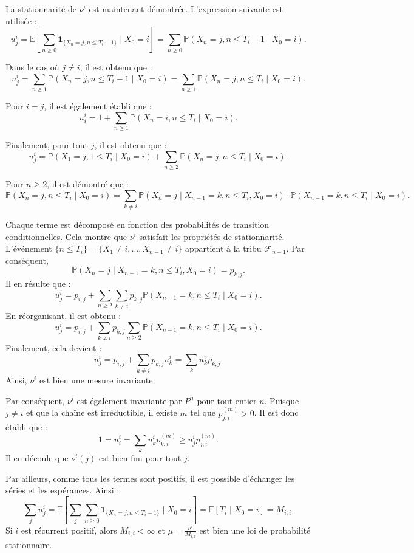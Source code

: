 \begin{sloppypar}
La stationnarité de $\nu^i$ est maintenant démontrée. L'expression suivante est utilisée :
\[
u^i_j = \mathbb{E} \left[\sum_{n \geq 0} \mathbf{1}_{\{X_n = j, n \leq T_i - 1\}} \mid X_0 = i \right] 
= \sum_{n \geq 0} \mathbb{P}(X_n = j, n \leq T_i - 1 \mid X_0 = i).
\]

Dans le cas où $j \neq i$, il est obtenu que :
\[
u^i_j = \sum_{n \geq 1} \mathbb{P}(X_n = j, n \leq T_i - 1 \mid X_0 = i) = \sum_{n \geq 1} \mathbb{P}(X_n = j, n \leq T_i \mid X_0 = i).
\]

Pour $i = j$, il est également établi que :
\[
u^i_i = 1 + \sum_{n \geq 1} \mathbb{P}(X_n = i, n \leq T_i \mid X_0 = i).
\]

Finalement, pour tout $j$, il est obtenu que :
\[
u^i_j = \mathbb{P}(X_1 = j, 1 \leq T_i \mid X_0 = i) + \sum_{n \geq 2} \mathbb{P}(X_n = j, n \leq T_i \mid X_0 = i).
\]

Pour $n \geq 2$, il est démontré que :
\[
\mathbb{P}(X_n = j, n \leq T_i \mid X_0 = i) = \sum_{k \neq i} \mathbb{P}(X_n = j \mid X_{n-1} = k, n \leq T_i, X_0 = i) \cdot \mathbb{P}(X_{n-1} = k, n \leq T_i \mid X_0 = i).
\]

Chaque terme est décomposé en fonction des probabilités de transition conditionnelles. Cela montre que $\nu^i$ satisfait les propriétés de stationnarité.\\

L’événement $\{n \leq T_i\} = \{X_1 \neq i, \dots, X_{n-1} \neq i\}$ appartient à la tribu $\mathcal{F}_{n-1}$. Par conséquent, 
\[
\mathbb{P}(X_n = j \mid X_{n-1} = k, n \leq T_i, X_0 = i) = p_{k,j}.
\]
Il en résulte que :
\[
u^i_j = p_{i,j} + \sum_{n \geq 2} \sum_{k \neq i} p_{k,j} \mathbb{P}(X_{n-1} = k, n \leq T_i \mid X_0 = i).
\]
En réorganisant, il est obtenu :
\[
u^i_j = p_{i,j} + \sum_{k \neq i} p_{k,j} \sum_{n \geq 2} \mathbb{P}(X_{n-1} = k, n \leq T_i \mid X_0 = i).
\]
Finalement, cela devient :
\[
u^i_j = p_{i,j} + \sum_{k \neq i} p_{k,j} u^i_k = \sum_k u^i_k p_{k,j}.
\]
Ainsi, $\nu^i$ est bien une mesure invariante. 

Par conséquent, $\nu^i$ est également invariante par $P^n$ pour tout entier $n$. Puisque $j \neq i$ et que la chaîne est irréductible, il existe $m$ tel que $p^{(m)}_{j,i} > 0$. Il est donc établi que :
\[
1 = u^i_i = \sum_k u^i_k p^{(m)}_{k,i} \geq u^i_j p^{(m)}_{j,i}.
\]
Il en découle que $\nu^i(j)$ est bien fini pour tout $j$.

Par ailleurs, comme tous les termes sont positifs, il est possible d’échanger les séries et les espérances. Ainsi :
\[
\sum_j u^i_j = \mathbb{E} \left[\sum_{j} \sum_{n \geq 0} \mathbf{1}_{\{X_n = j, n \leq T_i - 1\}} \mid X_0 = i \right] = \mathbb{E}[T_i \mid X_0 = i] = M_{i,i}.
\]
Si $i$ est récurrent positif, alors $M_{i,i} < \infty$ et $\mu = \frac{\nu^i}{M_{i,i}}$ est bien une loi de probabilité stationnaire.\\


\end{sloppypar}
